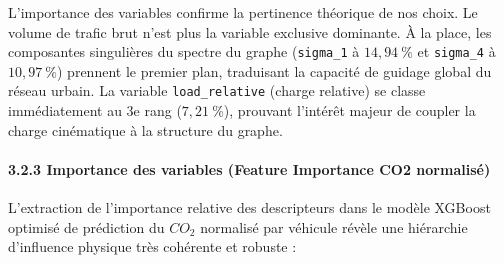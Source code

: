 \documentclass[10pt, a4paper]{article}
\begin{document}
L'importance des variables confirme la pertinence théorique de nos
choix. Le volume de trafic brut n'est plus la variable exclusive
dominante. À la place, les composantes singulières du spectre du graphe
(\texttt{sigma\_1} à \(14,94\ \%\) et \texttt{sigma\_4} à \(10,97\ \%\))
prennent le premier plan, traduisant la capacité de guidage global du
réseau urbain. La variable \texttt{load\_relative} (charge relative) se
classe immédiatement au 3e rang (\(7,21\ \%\)), prouvant l'intérêt
majeur de coupler la charge cinématique à la structure du graphe.

\newpage

\paragraph{3.2.3 Importance des variables (Feature Importance CO2
normalisé)}\label{importance-des-variables-feature-importance-co2-normalisuxe9}

L'extraction de l'importance relative des descripteurs dans le modèle
XGBoost optimisé de prédiction du \(CO_2\) normalisé par véhicule révèle
une hiérarchie d'influence physique très cohérente et robuste :
\end{document}
